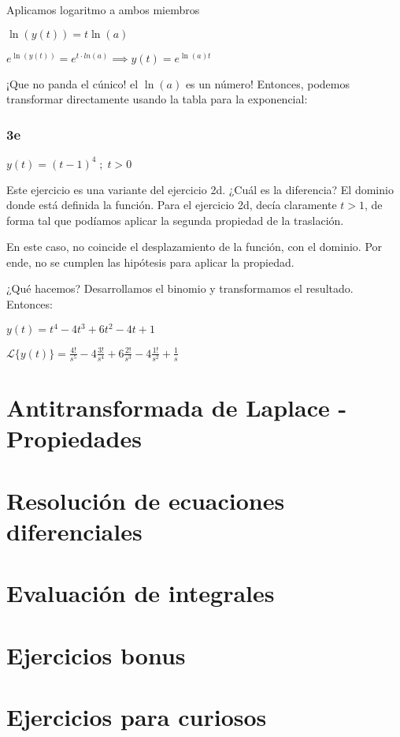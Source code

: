 \documentclass[11pt]{article}
\newcommand{\lapl}[1]{\mathscr{L} \lbrace {#1} \rbrace}
\begin{document}
    Aplicamos logaritmo a ambos miembros
    
    $\ln(y(t))=t \ln(a)$
    
    $ \displaystyle e^{\ln(y(t))}=e^{t\cdot ln(a)} \implies y(t)=e^{\ln(a)t}$
    
    ¡Que no panda el cúnico! el $\ln(a)$ es un número! Entonces, podemos transformar directamente usando la tabla para la exponencial:
    
    
    \subsubsection{3e}
    $y(t)=(t-1)^{4} \; ; \; t>0$
    
    Este ejercicio es una variante del ejercicio 2d. ¿Cuál es la diferencia? El dominio donde está definida la función. Para el ejercicio 2d, decía claramente $t>1$, de forma tal que podíamos aplicar la segunda propiedad de la traslación.
    
    En este caso, no coincide el desplazamiento de la función, con el dominio. Por ende, no se cumplen las hipótesis para aplicar la propiedad.
    
    ¿Qué hacemos? Desarrollamos el binomio y transformamos el resultado. Entonces:
    
    $y(t)=t^{4}-4t^{3}+6t^{2}-4t+1$
    
    $\displaystyle \lapl{y(t)}=\frac{4!}{s^{5}}-4\frac{3!}{s^{4}}+6\frac{2!}{s^{3}}-4\frac{1!}{s^{2}}+\frac{1}{s}$
    
	
	\section{Antitransformada de Laplace - Propiedades}
	\section{Resolución de ecuaciones diferenciales}
	\section{Evaluación de integrales}
	\section{Ejercicios bonus}
	\section{Ejercicios para curiosos}
\end{document}
